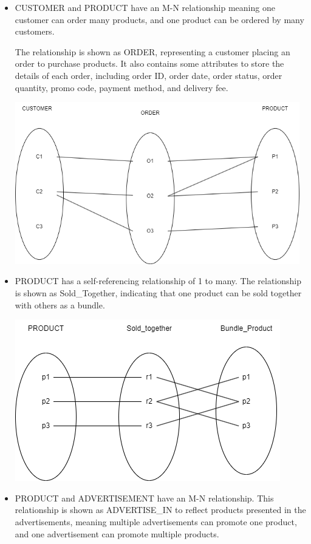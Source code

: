 \documentclass[
  letterpaper,
  DIV=11,
  numbers=noendperiod]{scrartcl}
\begin{document}
\begin{itemize}
\item
  CUSTOMER and PRODUCT have an M-N relationship meaning one customer can
  order many products, and one product can be ordered by many customers.

  The relationship is shown as ORDER, representing a customer placing an
  order to purchase products. It also contains some attributes to store
  the details of each order, including order ID, order date, order
  status, order quantity, promo code, payment method, and delivery fee.

  \includegraphics[width=4.875in,height=\textheight]{images/Customer-Product relationship.drawio.png}
\item
  PRODUCT has a self-referencing relationship of 1 to many. The
  relationship is shown as Sold\_Together, indicating that one product
  can be sold together with others as a bundle.

  \includegraphics{images/Product Self-reference Relationship.drawio.png}
\item
  PRODUCT and ADVERTISEMENT have an M-N relationship. This relationship
  is shown as ADVERTISE\_IN to reflect products presented in the
  advertisements, meaning multiple advertisements can promote one
  product, and one advertisement can promote multiple products.~


\end{itemize}
\end{document}
